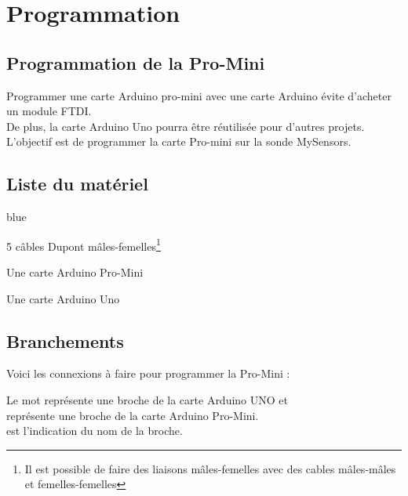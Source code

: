 \chapter{Programmation}

\section{Programmation de la Pro-Mini}

Programmer une carte Arduino pro-mini avec une carte Arduino évite d'acheter un module FTDI.\\
De plus, la carte Arduino Uno pourra être réutilisée pour d'autres projets.\\

L'objectif est de programmer la carte Pro-mini sur la sonde MySensors.

\section{Liste du matériel}

\begin{items}{blue}{\Triangle}
    \item 5 câbles Dupont mâles-femelles\footnote{Il est possible de faire des liaisons mâles-femelles avec des cables mâles-mâles et femelles-femelles}

    \item Une carte Arduino Pro-Mini

    \item Une carte Arduino Uno

    \end{items}

  \section{Branchements}

 

  Voici les connexions à faire pour programmer la Pro-Mini : 

  Le mot  représente une broche de la carte Arduino UNO et \\ 
   représente une broche de la carte Arduino Pro-Mini.\\
   est l'indication du nom de la broche.

